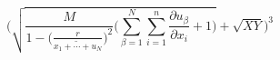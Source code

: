 \documentclass[b5paper]{article}
\begin{document}
\[
\Bigg(\sqrt{\frac{M}{1 - \big(\frac{r}{\widetilde{x_1 + \cdots + u_N}} \big)^2}\big(\sum_{\beta =1}^{N} \sum_{i=1}^{n}\frac{\partial u_{\beta}}{\partial x_i} + 1 \big) } + \sqrt{XY} \Bigg)^3
\]
\end{document}

